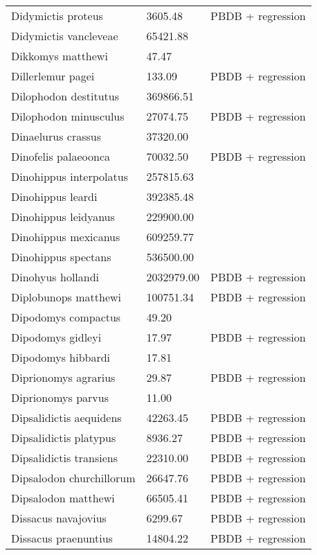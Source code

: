 \begin{center}
\begin{longtable}{p{} p{} p{} }
  Didymictis proteus & 3605.48 & PBDB + regression \\ 
  Didymictis vancleveae & 65421.88 & \cite{Scott2004} \\ 
  Dikkomys matthewi & 47.47 & \cite{Tomiya2013} \\ 
  Dillerlemur pagei & 133.09 & PBDB + regression \\ 
  Dilophodon destitutus & 369866.51 & \cite{Sinclair1915} \\ 
  Dilophodon minusculus & 27074.75 & PBDB + regression \\ 
  Dinaelurus crassus & 37320.00 & \cite{McKenna2011} \\ 
  Dinofelis palaeoonca & 70032.50 & PBDB + regression \\ 
  Dinohippus interpolatus & 257815.63 & \cite{Tomiya2013} \\ 
  Dinohippus leardi & 392385.48 & \cite{Tomiya2013} \\ 
  Dinohippus leidyanus & 229900.00 & \cite{MacFadden1986} \\ 
  Dinohippus mexicanus & 609259.77 & \cite{Tomiya2013} \\ 
  Dinohippus spectans & 536500.00 & \cite{McKenna2011} \\ 
  Dinohyus hollandi & 2032979.00 & PBDB + regression \\ 
  Diplobunops matthewi & 100751.34 & PBDB + regression \\ 
  Dipodomys compactus & 49.20 & \cite{Smith2004} \\ 
  Dipodomys gidleyi & 17.97 & PBDB + regression \\ 
  Dipodomys hibbardi & 17.81 & \cite{Tomiya2013} \\ 
  Diprionomys agrarius & 29.87 & PBDB + regression \\ 
  Diprionomys parvus & 11.00 & \cite{McKenna2011} \\ 
  Dipsalidictis aequidens & 42263.45 & PBDB + regression \\ 
  Dipsalidictis platypus & 8936.27 & PBDB + regression \\ 
  Dipsalidictis transiens & 22310.00 & PBDB + regression \\ 
  Dipsalodon churchillorum & 26647.76 & PBDB + regression \\ 
  Dipsalodon matthewi & 66505.41 & PBDB + regression \\ 
  Dissacus navajovius & 6299.67 & PBDB + regression \\ 
  Dissacus praenuntius & 14804.22 & PBDB + regression \\ 

\end{longtable}
\end{center}
